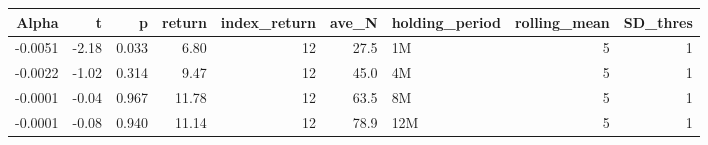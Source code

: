 \begin{table}[ht]
\centering
\begin{tabular}{rrrrrrlrr}
  \hline
Alpha & t & p & return & index\_return & ave\_N & holding\_period & rolling\_mean & SD\_thres \\ 
  \hline
-0.0051 & -2.18 & 0.033 & 6.80 & 12 & 27.5 & 1M &  5 &  1 \\ 
  -0.0022 & -1.02 & 0.314 & 9.47 & 12 & 45.0 & 4M &  5 &  1 \\ 
  -0.0001 & -0.04 & 0.967 & 11.78 & 12 & 63.5 & 8M &  5 &  1 \\ 
  -0.0001 & -0.08 & 0.940 & 11.14 & 12 & 78.9 & 12M &  5 &  1 \\ 
   \hline
\end{tabular}
\end{table}

